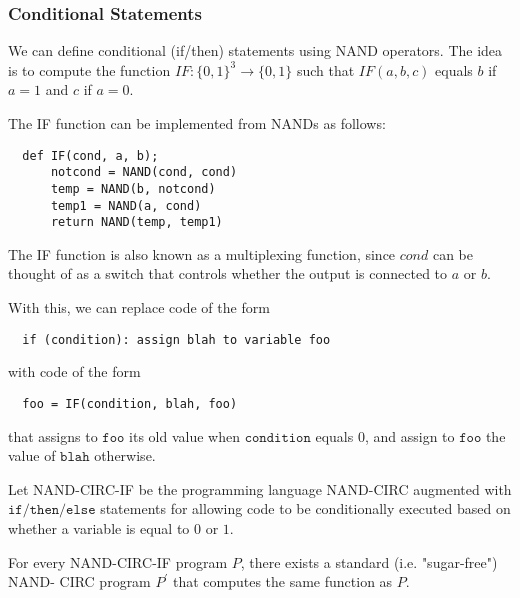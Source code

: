 \documentclass{article}
\begin{document}
  \subsubsection{Conditional Statements}
  We can define conditional (if/then) statements using NAND operators. The idea is to compute the function $IF: \{0,1\}^3 \longrightarrow \{0,1\}$ such that $IF(a, b, c)$ equals $b$ if $a = 1$ and $c$ if $a = 0$. 

  \begin{definition}
  The IF function can be implemented from NANDs as follows: 
  \begin{lstlisting}
  def IF(cond, a, b);
      notcond = NAND(cond, cond) 
      temp = NAND(b, notcond)
      temp1 = NAND(a, cond)
      return NAND(temp, temp1)
  \end{lstlisting}
  The IF function is also known as a multiplexing function, since $cond$ can be thought of as a switch that controls whether the output is connected to $a$ or $b$. 
  \end{definition}

  With this, we can replace code of the form 
  \begin{lstlisting}
  if (condition): assign blah to variable foo
  \end{lstlisting}
  with code of the form 
  \begin{lstlisting}
  foo = IF(condition, blah, foo) 
  \end{lstlisting}
  that assigns to $\texttt{foo}$ its old value when $\texttt{condition}$ equals $0$, and assign to $\texttt{foo}$ the value of $\texttt{blah}$ otherwise.

  \begin{definition}
  Let NAND-CIRC-IF be the programming language NAND-CIRC augmented with $\texttt{if/then/else}$ statements for allowing code to be conditionally executed based on whether a variable is equal to $0$ or $1$. 
  \end{definition}

  \begin{theorem}
  For every NAND-CIRC-IF program $P$, there exists a standard (i.e. "sugar-free") NAND- CIRC program $P^\prime$ that computes the same function as $P$. 
  \end{theorem}
\end{document}
